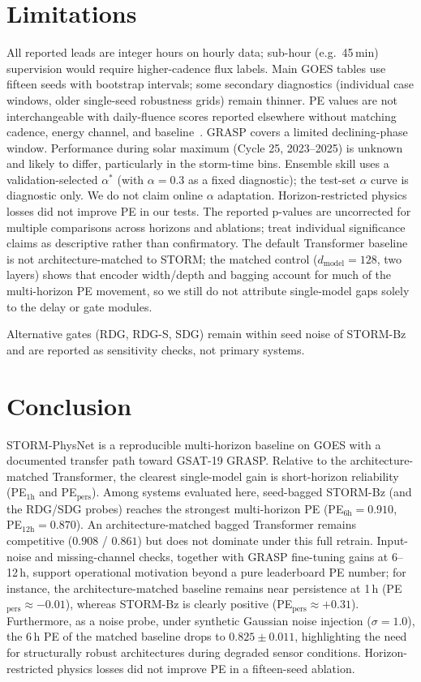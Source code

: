 \documentclass{ieeeaccess}
\begin{document}
\section{Limitations}
\label{sec:limits}
All reported leads are integer hours on hourly data; sub-hour (e.g.\ 45\,min) supervision would require higher-cadence flux labels.
Main GOES tables use fifteen seeds with bootstrap intervals; some
secondary diagnostics (individual case windows, older single-seed
robustness grids) remain thinner. PE values are not interchangeable with
daily-fluence scores reported elsewhere without matching cadence, energy
channel, and baseline~\cite{b21,b22}. GRASP covers a limited declining-phase
window. Performance during solar maximum (Cycle 25, 2023--2025) is unknown and likely to differ, particularly in the storm-time bins. Ensemble skill uses a validation-selected \(\alpha^*\) (with \(\alpha=0.3\) as a fixed diagnostic); the test-set \(\alpha\) curve is diagnostic only.
We do not claim online \(\alpha\) adaptation. Horizon-restricted
physics losses did not improve PE in our tests. The reported p-values are uncorrected for multiple comparisons across horizons and ablations; treat individual significance claims as descriptive rather than confirmatory.
The default Transformer baseline is not architecture-matched to STORM; the matched
control (\(d_{\mathrm{model}}=128\), two layers) shows that encoder width/depth and bagging
account for much of the multi-horizon PE movement, so we still do not attribute
single-model gaps solely to the delay or gate modules.

Alternative gates (RDG, RDG-S, SDG) remain within seed noise of STORM-Bz and are reported as sensitivity checks, not primary systems.

\section{Conclusion}
\label{sec:conclusion}
STORM-PhysNet is a reproducible multi-horizon baseline on GOES with a documented
transfer path toward GSAT-19 GRASP. Relative to the architecture-matched Transformer, the clearest single-model gain is short-horizon
reliability (PE$_{1\mathrm{h}}$ and PE$_{\mathrm{pers}}$).
Among systems evaluated here, seed-bagged STORM-Bz (and the RDG/SDG probes)
reaches the strongest multi-horizon PE
(PE$_{6\mathrm{h}}=0.910$, PE$_{12\mathrm{h}}=0.870$).
An architecture-matched bagged Transformer remains competitive
(\(0.908\) / \(0.861\)) but does not dominate under this full retrain.
Input-noise and missing-channel checks, together with GRASP fine-tuning
gains at 6--12\,h, support operational motivation beyond a pure leaderboard PE
number; for instance, the architecture-matched baseline remains near persistence at 1\,h (PE$_{\mathrm{pers}}\approx-0.01$), whereas STORM-Bz is clearly positive (PE$_{\mathrm{pers}}\approx+0.31$). Furthermore, as a noise probe, under synthetic Gaussian noise injection (\(\sigma=1.0\)), the 6\,h PE of the matched baseline drops to \(0.825 \pm 0.011\), highlighting the need for structurally robust architectures during degraded sensor conditions. Horizon-restricted physics losses did not improve PE in a fifteen-seed
ablation.
\end{document}
